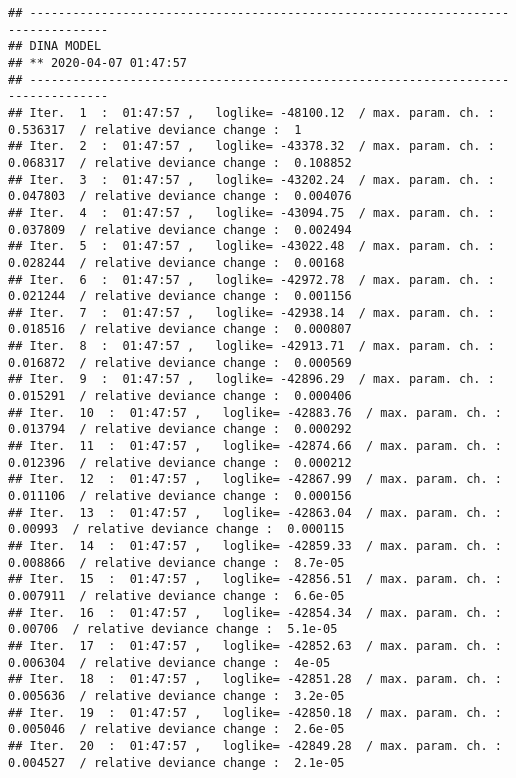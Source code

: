 \documentclass[]{article}
\begin{document}
\begin{verbatim}
## ---------------------------------------------------------------------------------
## DINA MODEL 
## ** 2020-04-07 01:47:57 
## ---------------------------------------------------------------------------------
## Iter.  1  :  01:47:57 ,   loglike= -48100.12  / max. param. ch. :  0.536317  / relative deviance change :  1
## Iter.  2  :  01:47:57 ,   loglike= -43378.32  / max. param. ch. :  0.068317  / relative deviance change :  0.108852
## Iter.  3  :  01:47:57 ,   loglike= -43202.24  / max. param. ch. :  0.047803  / relative deviance change :  0.004076
## Iter.  4  :  01:47:57 ,   loglike= -43094.75  / max. param. ch. :  0.037809  / relative deviance change :  0.002494
## Iter.  5  :  01:47:57 ,   loglike= -43022.48  / max. param. ch. :  0.028244  / relative deviance change :  0.00168
## Iter.  6  :  01:47:57 ,   loglike= -42972.78  / max. param. ch. :  0.021244  / relative deviance change :  0.001156
## Iter.  7  :  01:47:57 ,   loglike= -42938.14  / max. param. ch. :  0.018516  / relative deviance change :  0.000807
## Iter.  8  :  01:47:57 ,   loglike= -42913.71  / max. param. ch. :  0.016872  / relative deviance change :  0.000569
## Iter.  9  :  01:47:57 ,   loglike= -42896.29  / max. param. ch. :  0.015291  / relative deviance change :  0.000406
## Iter.  10  :  01:47:57 ,   loglike= -42883.76  / max. param. ch. :  0.013794  / relative deviance change :  0.000292
## Iter.  11  :  01:47:57 ,   loglike= -42874.66  / max. param. ch. :  0.012396  / relative deviance change :  0.000212
## Iter.  12  :  01:47:57 ,   loglike= -42867.99  / max. param. ch. :  0.011106  / relative deviance change :  0.000156
## Iter.  13  :  01:47:57 ,   loglike= -42863.04  / max. param. ch. :  0.00993  / relative deviance change :  0.000115
## Iter.  14  :  01:47:57 ,   loglike= -42859.33  / max. param. ch. :  0.008866  / relative deviance change :  8.7e-05
## Iter.  15  :  01:47:57 ,   loglike= -42856.51  / max. param. ch. :  0.007911  / relative deviance change :  6.6e-05
## Iter.  16  :  01:47:57 ,   loglike= -42854.34  / max. param. ch. :  0.00706  / relative deviance change :  5.1e-05
## Iter.  17  :  01:47:57 ,   loglike= -42852.63  / max. param. ch. :  0.006304  / relative deviance change :  4e-05
## Iter.  18  :  01:47:57 ,   loglike= -42851.28  / max. param. ch. :  0.005636  / relative deviance change :  3.2e-05
## Iter.  19  :  01:47:57 ,   loglike= -42850.18  / max. param. ch. :  0.005046  / relative deviance change :  2.6e-05
## Iter.  20  :  01:47:57 ,   loglike= -42849.28  / max. param. ch. :  0.004527  / relative deviance change :  2.1e-05

\end{verbatim}
\end{document}
